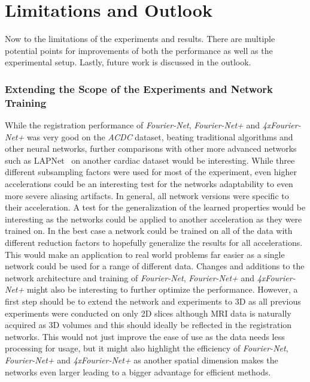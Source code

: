 \section{Limitations and Outlook} \label{Sec:LimitationsOutlook}
Now to the limitations of the experiments and results. There are multiple potential points for improvements of both the performance as well as the experimental setup. Lastly, future work is discussed in the outlook.

\subsubsection{Extending the Scope of the Experiments and Network Training} \label{SubSubSec:ExtendingScopeExperimentsNetworkTraining}
While the registration performance of \emph{Fourier-Net}, \emph{Fourier-Net+} and \emph{4xFourier-Net+} was very good on the \emph{ACDC} dataset, beating traditional algorithms and other neural networks, further comparisons with other more advanced networks such as LAPNet~\cite{LAPNet} on another cardiac dataset would be interesting. While three different subsampling factors were used for most of the experiment, even higher accelerations could be an interesting test for the networks adaptability to even more severe aliasing artifacts. In general, all network versions were specific to their acceleration. A test for the generalization of the learned properties would be interesting as the networks could be applied to another acceleration as they were trained on. In the best case a network could be trained on all of the data with different reduction factors to hopefully generalize the results for all accelerations. This would make an application to real world problems far easier as a single network could be used for a range of different data. Changes and additions to the network architecture and training of \emph{Fourier-Net}, \emph{Fourier-Net+} and \emph{4xFourier-Net+} might also be interesting to further optimize the performance. However, a first step should be to extend the network and experiments to 3D as all previous experiments were conducted on only 2D slices although MRI data is naturally acquired as 3D volumes and this should ideally be reflected in the registration networks. This would not just improve the ease of use as the data needs less processing for usage, but it might also highlight the efficiency of \emph{Fourier-Net}, \emph{Fourier-Net+} and \emph{4xFourier-Net+} as another spatial dimension makes the networks even larger leading to a bigger advantage for efficient methods.

